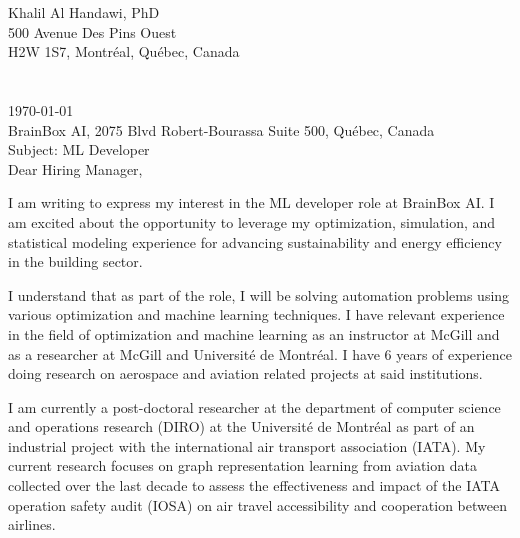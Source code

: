 \documentclass[12pt]{article} %
\begin{document}

Khalil Al Handawi, PhD\\
500 Avenue Des Pins Ouest\\
H2W 1S7, Montr\'{e}al, Qu\'{e}bec, Canada\\
\faPhone~~\cvnumberphone\\
\faEnvelope~~\href{mailto:\cvmail}{\cvmail}\\

\today\\

BrainBox AI, 2075 Blvd Robert-Bourassa Suite 500, Qu\'{e}bec, Canada\\
Subject: ML Developer\\[6pt]


Dear Hiring Manager,

\medskip %

I am writing to express my interest in the ML developer role at BrainBox AI. I am excited about the opportunity to leverage my optimization, simulation, and statistical modeling experience for advancing sustainability and energy efficiency in the building sector.

\medskip %

I understand that as part of the role, I will be solving automation problems using various optimization and machine learning techniques. I have relevant experience in the field of optimization and machine learning as an instructor at McGill and as a researcher at McGill and Universit\'{e} de Montr\'{e}al. I have 6 years of experience doing research on aerospace and aviation related projects at said institutions.

I am currently a post-doctoral researcher at the department of computer science and operations research (DIRO) at the Universit\'{e} de Montr\'{e}al as part of an industrial project with the international air transport association (IATA). My current research focuses on graph representation learning from aviation data collected over the last decade to assess the effectiveness and impact of the IATA operation safety audit (IOSA) on air travel accessibility and cooperation between airlines. 
\end{document}
